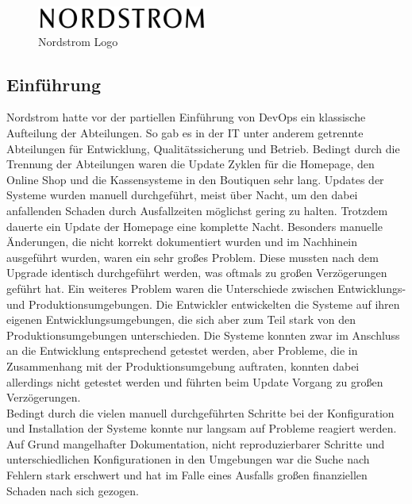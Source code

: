 \begin{figure}[ht]
  \centering
  \includegraphics[width=0.5\textwidth]{img/nordstrom_logo.png}
  \caption{Nordstrom Logo \parencite[][]{Nordstrom:2016}}
  \label{fig:scrummodell}
\end{figure}

\subsection{Einführung}
Nordstrom hatte vor der partiellen Einführung von DevOps ein klassische Aufteilung der Abteilungen. So gab es in der IT unter anderem getrennte Abteilungen für Entwicklung, Qualitätssicherung und Betrieb. \parencite[Vgl.][S. 1]{Reed:2014} Bedingt durch die Trennung der Abteilungen waren die Update Zyklen für die Homepage, den Online Shop und die Kassensysteme in den Boutiquen sehr lang. Updates der Systeme wurden manuell durchgeführt, meist über Nacht, um den dabei anfallenden Schaden durch Ausfallzeiten möglichst gering zu halten. Trotzdem dauerte ein Update der Homepage eine komplette Nacht. Besonders manuelle Änderungen, die nicht korrekt dokumentiert wurden und im Nachhinein ausgeführt wurden, waren ein sehr großes Problem. Diese mussten nach dem Upgrade identisch durchgeführt werden, was oftmals zu großen Verzögerungen geführt hat. Ein weiteres Problem waren die Unterschiede zwischen Entwicklungs- und Produktionsumgebungen. Die Entwickler entwickelten die Systeme auf ihren eigenen Entwicklungsumgebungen, die sich aber zum Teil stark von den Produktionsumgebungen unterschieden. Die Systeme konnten zwar im Anschluss an die Entwicklung entsprechend getestet werden, aber Probleme, die in Zusammenhang mit der Produktionsumgebung auftraten, konnten dabei allerdings nicht getestet werden und führten beim Update Vorgang zu großen Verzögerungen.\\
Bedingt durch die vielen manuell durchgeführten Schritte bei der Konfiguration und Installation der Systeme konnte nur langsam auf Probleme reagiert werden. Auf Grund mangelhafter Dokumentation, nicht reproduzierbarer Schritte und unterschiedlichen Konfigurationen in den Umgebungen war die Suche nach Fehlern stark erschwert und hat im Falle eines Ausfalls großen finanziellen Schaden nach sich gezogen. \parencite[Vgl.][S. 3]{Reed:2014}


